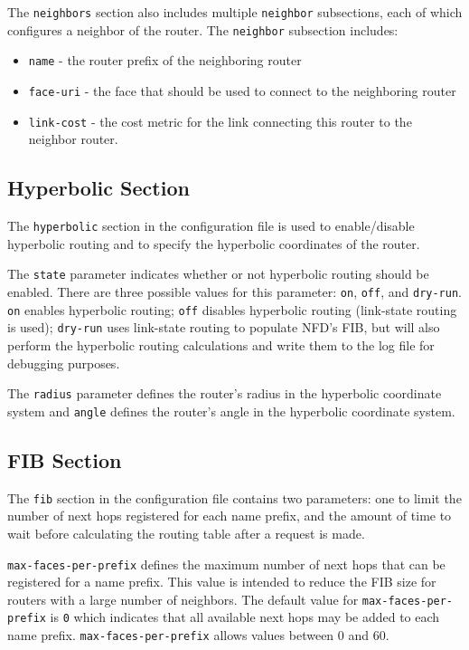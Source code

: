 The \texttt{neighbors} section also includes multiple \texttt{neighbor} subsections, each of which configures a neighbor of the router.
The \texttt{neighbor} subsection includes:
\begin{itemize}
\item \texttt{name} - the router prefix of the neighboring router
\item \texttt{face-uri} - the face that should be used to connect to the neighboring router
\item \texttt{link-cost} - the cost metric for the link connecting this router to the neighbor router.
\end{itemize}

\subsection{Hyperbolic Section}

The \texttt{hyperbolic} section in the configuration file is used to enable/disable hyperbolic routing and to specify the hyperbolic coordinates of the router.

The \texttt{state} parameter indicates whether or not hyperbolic routing should be enabled. There are three possible values for this parameter: \texttt{on}, \texttt{off}, and \texttt{dry-run}. \texttt{on} enables hyperbolic routing; \texttt{off} disables hyperbolic routing (link-state routing is used); \texttt{dry-run} uses link-state routing to populate NFD's FIB, but will also perform the hyperbolic routing calculations and write them to the log file for debugging purposes.

The \texttt{radius} parameter defines the router's radius in the hyperbolic coordinate system and \texttt{angle} defines the router's angle in the hyperbolic coordinate system.

\subsection{FIB Section}

The \texttt{fib} section in the configuration file contains two parameters: one to limit the number of next hops registered for each name prefix, and the amount of time to wait before calculating the routing table after a request is made.

\texttt{max-faces-per-prefix} defines the maximum number of next hops that can be registered for a name prefix.
This value is intended to reduce the FIB size for routers with a large number of neighbors.
The default value for \texttt{max-faces-per-prefix} is \texttt{0} which indicates that all available next hops may be added to each name prefix. \texttt{max-faces-per-prefix} allows values between 0 and 60.

